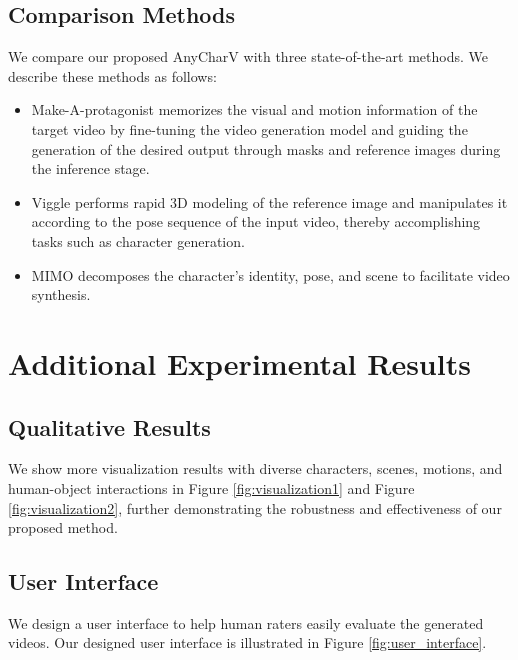 \subsection{Comparison Methods}

We compare our proposed AnyCharV with three state-of-the-art methods. We describe these methods as follows:
\begin{itemize}
    \item Make-A-protagonist \cite{zhao2023make} memorizes the visual and motion information of the target video by fine-tuning the video generation model and guiding the generation of the desired output through masks and reference images during the inference stage.
    \item Viggle \cite{viggle2024} performs rapid 3D modeling of the reference image and manipulates it according to the pose sequence of the input video, thereby accomplishing tasks such as character generation.
    \item MIMO \cite{men2024mimo} decomposes the character's identity, pose, and scene to facilitate video synthesis.
\end{itemize}


\section{Additional Experimental Results}
\label{sec:appendix_exp_results}









\subsection{Qualitative Results}
We show more visualization results with diverse characters, scenes, motions, and human-object interactions in Figure \ref{fig:visualization1} and Figure \ref{fig:visualization2}, further demonstrating the robustness and effectiveness of our proposed method.



\subsection{User Interface}

We design a user interface to help human raters easily evaluate the generated videos. 
Our designed user interface is illustrated in Figure \ref{fig:user_interface}.


